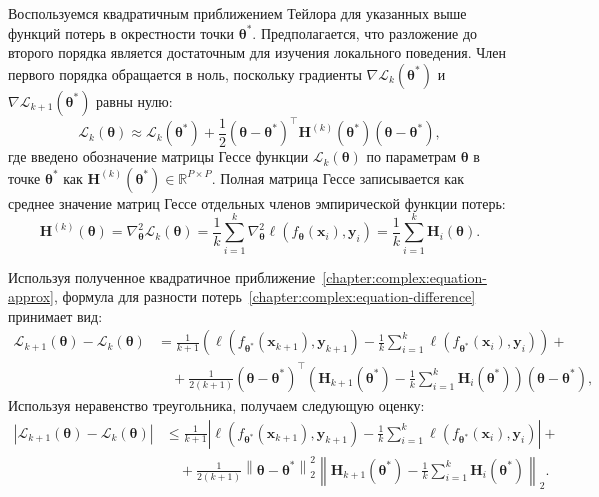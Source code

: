 Воспользуемся квадратичным приближением Тейлора для указанных выше функций потерь в окрестности точки $\boldsymbol{\theta}^*$. Предполагается, что разложение до второго порядка является достаточным для изучения локального поведения. Член первого порядка обращается в ноль, поскольку градиенты $\nabla \mathcal{L}_{k}(\boldsymbol{\theta}^*)$ и $\nabla \mathcal{L}_{k+1}(\boldsymbol{\theta}^*)$ равны нулю:
\begin{equation}\label{chapter:complex:equation-approx}
    \mathcal{L}_{k}(\boldsymbol{\theta}) \approx \mathcal{L}_{k}(\boldsymbol{\theta}^*) + \frac{1}{2} (\boldsymbol{\theta} - \boldsymbol{\theta}^*)^\top \mathbf{H}^{(k)}(\boldsymbol{\theta}^*) (\boldsymbol{\theta} - \boldsymbol{\theta}^*),
\end{equation}
где введено обозначение матрицы Гессе функции $\mathcal{L}_{k}(\boldsymbol{\theta})$ по параметрам $\boldsymbol{\theta}$ в точке $\boldsymbol{\theta}^*$ как $\mathbf{H}^{(k)}(\boldsymbol{\theta}^*) \in \mathbb{R}^{P \times P}$. Полная матрица Гессе записывается как среднее значение матриц Гессе отдельных членов эмпирической функции потерь:
\[
    \mathbf{H}^{(k)}(\boldsymbol{\theta}) = \nabla^2_{\boldsymbol{\theta}} \mathcal{L}_{k}(\boldsymbol{\theta}) = \frac{1}{k} \sum\limits_{i=1}^{k} \nabla^2_{\boldsymbol{\theta}} \ell(f_{\boldsymbol{\theta}}(\mathbf{x}_{i}), \mathbf{y}_{i}) = \frac{1}{k} \sum\limits_{i=1}^{k} \mathbf{H}_{i}(\boldsymbol{\theta}).
\]

Используя полученное квадратичное приближение~\eqref{chapter:complex:equation-approx}, формула для разности потерь~\eqref{chapter:complex:equation-difference} принимает вид:
\begin{align}
    \mathcal{L}_{k+1}(\boldsymbol{\theta}) - \mathcal{L}_k(\boldsymbol{\theta}) &= \frac{1}{k+1} \left( \ell(f_{\boldsymbol{\theta}^*}(\mathbf{x}_{k+1}), \mathbf{y}_{k+1}) - \frac{1}{k} \sum\limits_{i=1}^{k} \ell(f_{\boldsymbol{\theta}^*}(\mathbf{x}_{i}), \mathbf{y}_{i}) \right) +\\
    &\quad+ \frac{1}{2(k+1)} (\boldsymbol{\theta} - \boldsymbol{\theta}^*)^\top \left( \mathbf{H}_{k+1}(\boldsymbol{\theta}^*) - \frac{1}{k} \sum\limits_{i=1}^{k} \mathbf{H}_{i}(\boldsymbol{\theta}^*) \right) (\boldsymbol{\theta} - \boldsymbol{\theta}^*),
\end{align}
Используя неравенство треугольника, получаем следующую оценку:
\begin{align}\label{chapter:complex:equation-mod-difference-full}
    \left| \mathcal{L}_{k+1}(\boldsymbol{\theta}) - \mathcal{L}_k(\boldsymbol{\theta}) \right| &\leqslant \frac{1}{k+1} \left| \ell(f_{\boldsymbol{\theta}^*}(\mathbf{x}_{k+1}), \mathbf{y}_{k+1}) - \frac{1}{k} \sum\limits_{i=1}^{k} \ell(f_{\boldsymbol{\theta}^*}(\mathbf{x}_{i}), \mathbf{y}_{i}) \right| +\\
    &\quad+ \frac{1}{2(k+1)} \left\|\boldsymbol{\theta} - \boldsymbol{\theta}^*\right\|_2^2 \left\| \mathbf{H}_{k+1}(\boldsymbol{\theta}^*) - \frac{1}{k} \sum\limits_{i=1}^{k} \mathbf{H}_{i}(\boldsymbol{\theta}^*) \right\|_2.
\end{align}

